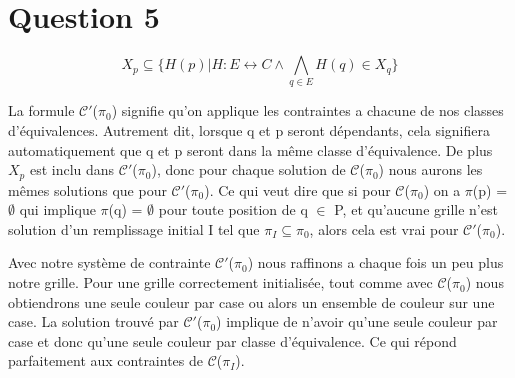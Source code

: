 
\section{Question 5}

$$X_p \subseteq \lbrace H(p) \vert H : E \leftrightarrow C \wedge \bigwedge_{q \in E} H(q) \in X_q \rbrace$$

La formule $\mathcal{C'}$($\pi_0$) signifie qu'on applique les contraintes a chacune de nos classes d'\'equivalences.
Autrement dit, lorsque q et p seront d\'ependants, cela signifiera automatiquement que q et p seront dans la m\^eme classe d'\'equivalence.  De plus $X_p$ est inclu dans $\mathcal{C'}$($\pi_0$), donc pour chaque solution de $\mathcal{C}$($\pi_0$) nous aurons les m\^emes solutions que pour $\mathcal{C'}$($\pi_0$). Ce qui veut dire que si pour $\mathcal{C}$($\pi_0$) on a $\pi$(p) = $\emptyset$ qui implique $\pi$(q) = $\emptyset$ pour toute position de q $\in$ P, et qu'aucune grille n'est solution d'un remplissage initial I tel que $\pi_I \subseteq \pi_0$, alors cela est vrai pour $\mathcal{C'}$($\pi_0$).

\bigskip
Avec notre syst\`eme de contrainte $\mathcal{C'}$($\pi_0$) nous raffinons a chaque fois un peu plus notre grille. Pour une grille correctement initialis\'ee, tout comme avec $\mathcal{C}$($\pi_0$) nous obtiendrons une seule couleur par case ou alors un ensemble de couleur sur une case. La solution trouv\'e par $\mathcal{C'}$($\pi_0$) implique de n'avoir qu'une seule couleur par case et donc qu'une seule couleur par classe d'\'equivalence. Ce qui r\'epond parfaitement aux contraintes de $\mathcal{C}$($\pi_I$).

\bigskip

